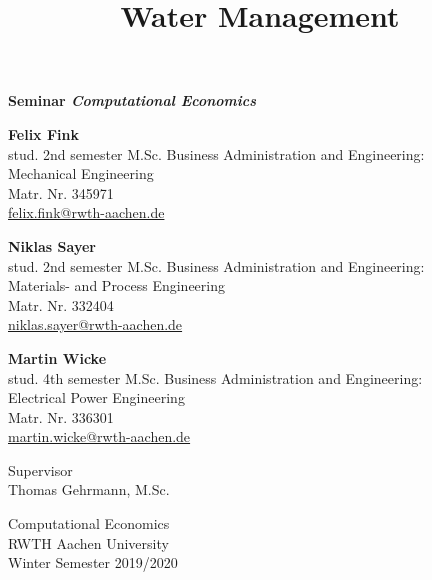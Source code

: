 \documentclass[12pt, a4paper, oneside]{article}
\title{Water Management}
\begin{document}
	\let\origref\ref %
	\let\ref\cref    %
	
	
	\begin{titlepage}
		\begin{center}
			\vspace*{1cm}
			
			\textbf{Seminar \textit{Computational Economics}}                
			
			\vspace{0.5cm}
			{\makeatletter{\@title}\makeatother}
			
			\vspace{1.5cm}
			
			\textbf{Felix Fink} \\
			stud. 2nd semester M.Sc. Business Administration and Engineering:\\Mechanical Engineering \\
			Matr. Nr. 345971 \\
			\href{mailto:felix.fink@rwth-aachen.de}{felix.fink@rwth-aachen.de} 
			
			\vspace{1cm}
			
			\textbf{Niklas Sayer} \\
			stud. 2nd semester M.Sc. Business Administration and Engineering:\\Materials- and Process Engineering\\
			Matr. Nr. 332404 \\
			\href{mailto:niklas.sayer@rwth-aachen.de}{niklas.sayer@rwth-aachen.de} 
			
			\vspace{1cm}
			
			\textbf{Martin Wicke} \\
			stud. 4th semester M.Sc. Business Administration and Engineering:\\Electrical Power Engineering\\
			Matr. Nr. 336301 \\
			\href{mailto:martin.wicke@rwth-aachen.de}{martin.wicke@rwth-aachen.de} 
			
			\vfill
			
			
			Supervisor\\
			Thomas Gehrmann, M.Sc.
			
			\vspace{0.8cm}
			
			
			Computational Economics\\
			RWTH Aachen University\\
			Winter Semester 2019/2020
			
		\end{center}
	\end{titlepage}
\end{document}
